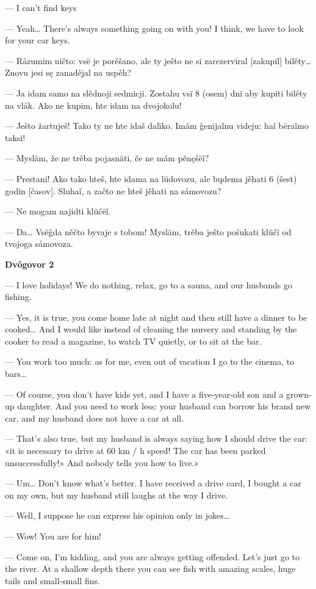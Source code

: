 — I can’t find keys

— Yeah… There’s always something going on with you! I think, we have to look for your car keys.


— Råzumim ničto: vsë je porěšano, ale ty ješto ne si zarezerviral [zakupil] bilěty… Znovu jesi sę zanadějal na uspěh?

— Ja idam samo na slědnoji sedmicji. Zostahu vsï 8 (osem) dnï aby kupiti bilěty na vlåk. Ako ne kupim, hte idam na dvojokolu!

— Ješto žartuješ! Tako ty ne hte idaš dalïko. Imám ĝenijalnu videju: haǐ bëraǐmo taksi!

— Mysläm, že ne trěba pojasnäti, če ne mám pěnęŝëǐ?

— Prestani! Ako tako hteš, hte idama na lüdovozu, ale bųdema jěhati 6 (šest) godin [časov]. Sluhaǐ, a začto ne hteš jěhati na sámovozu?

— Ne mogam najidti klüčëǐ.

— Da… Vsëĝda něčto byvaje s tobom! Mysläm, trěba ješto pošukati klüčï od tvojoga sámovoza.


\textbf{Dvôgovor 2}


— I love holidays! We do nothing, relax, go to a sauna, and our husbands go fishing.

— Yes, it is true, you come home late at night and then still have a dinner to be cooked… And I would like instead of cleaning the nursery and standing by the cooker to read a magazine, to watch TV quietly, or to sit at the bar.

— You work too much: as for me, even out of vacation I go to the cinema, to bars…

— Of course, you don’t have kids yet, and I have a five-year-old son and a grown-up daughter. And you need to work less: your husband can borrow his brand new car, and my husband does not have a car at all.

— That’s also true, but my husband is always saying how I should drive the car: «it is necessary to drive at 60 km / h speed! The car has been parked unsuccessfully!» And nobody tells you how to live.»

— Um… Don’t know what’s better. I have received a drive card, I bought a car on my own, but my husband still laughs at the way I drive.

— Well, I suppose he can express his opinion only in jokes…

— Wow! You are for him!

— Come on, I’m kidding, and you are always getting offended. Let’s just go to the river. At a shallow depth there you can see fish with amazing scales, huge tails and small-small fins.


